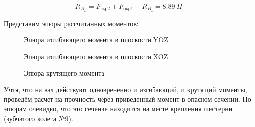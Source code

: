 \documentclass[14pt,a4paper,russian]{scrartcl}
\begin{document}
        \[ R_{A_x} = F_{\text{окр2}} + F_{\text{окр1}} - R_{B_x} = 8.89\ H\]

        Представим эпюры рассчитанных моментов:
 
        \begin{figure}[!h]
            \caption{Эпюра изгибающего момента в плоскости YOZ}
        \end{figure}

        \begin{figure}[h]
            \caption{Эпюра изгибающего момента в плоскости XOZ}
        \end{figure}
        \begin{figure}[h]
            \caption{Эпюра крутящего момента}
        \end{figure}

        Учтя, что на вал действуют одноврененно и изгибающий, и крутящий моменты,
        проведём расчет на прочность через приведенный момент в опасном сечении.
        По эпюрам очевидно, что это сечение находится на месте крепления шестерни
        (зубчатого колеса №9).
\end{document}
